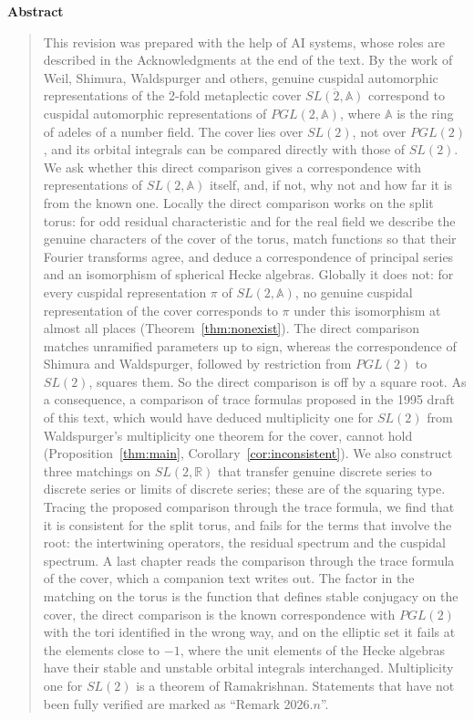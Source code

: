 \documentclass[12pt,letterpaper,openany]{book}
\theoremstyle{plain}
\theoremstyle{definition}
\theoremstyle{remark}
\theoremstyle{remark}
\newenvironment{abstract}%
  {\begin{center}\bfseries Abstract\end{center}\begin{quote}}%
  {\end{quote}}
\begin{document}
\begin{abstract}
This revision was prepared with the help of AI systems, whose roles are
described in the Acknowledgments at the end of the text.
By the work of Weil, Shimura, Waldspurger and others, genuine cuspidal
automorphic representations of the 2-fold metaplectic cover
$\overline{SL(2,\mathbb{A})}$ correspond to cuspidal automorphic
representations of $PGL(2,\mathbb{A})$, where $\mathbb{A}$ is the ring of
adeles of a number field. The cover lies over $SL(2)$, not over $PGL(2)$,
and its orbital integrals can be compared directly with those of $SL(2)$.
We ask whether this direct comparison gives a correspondence with
representations of $SL(2,\mathbb{A})$ itself, and, if not, why not and how
far it is from the known one. Locally the direct comparison works on the
split torus: for odd residual characteristic and for the real field we
describe the genuine characters of the cover of the torus, match functions
so that their Fourier transforms agree, and deduce a correspondence of
principal series and an isomorphism of spherical Hecke algebras. Globally
it does not: for every cuspidal representation $\pi$ of $SL(2,\mathbb{A})$,
no genuine cuspidal representation of the cover corresponds to $\pi$ under
this isomorphism at almost all places (Theorem~\ref{thm:nonexist}). The
direct comparison matches unramified parameters up to sign, whereas the
correspondence of Shimura and Waldspurger, followed by restriction from
$PGL(2)$ to $SL(2)$, squares them. So the direct comparison is off by a
square root. As a consequence, a comparison of trace formulas proposed in
the 1995 draft of this text, which would have deduced multiplicity one for
$SL(2)$ from Waldspurger's multiplicity one theorem for the cover, cannot
hold (Proposition~\ref{thm:main}, Corollary~\ref{cor:inconsistent}). We
also construct three matchings on $SL(2,\mathbb{R})$ that transfer genuine
discrete series to discrete series or limits of discrete series; these are
of the squaring type. Tracing the proposed comparison through the trace
formula, we find that it is consistent for the split torus, and fails for
the terms that involve the root: the intertwining operators, the residual
spectrum and the cuspidal spectrum. A last chapter reads the comparison
through the trace formula of the cover, which a companion text writes
out. The factor in the matching on the torus is the function that
defines stable conjugacy on the cover, the direct comparison is the
known correspondence with $PGL(2)$ with the tori identified in the wrong
way, and on the elliptic set it fails at the elements close to $-1$,
where the unit elements of the Hecke algebras have their stable and
unstable orbital integrals interchanged. Multiplicity one for $SL(2)$ is a theorem of
Ramakrishnan. Statements that have not been fully verified are marked as
``Remark 2026.$n$''.
\end{abstract}
\end{document}
